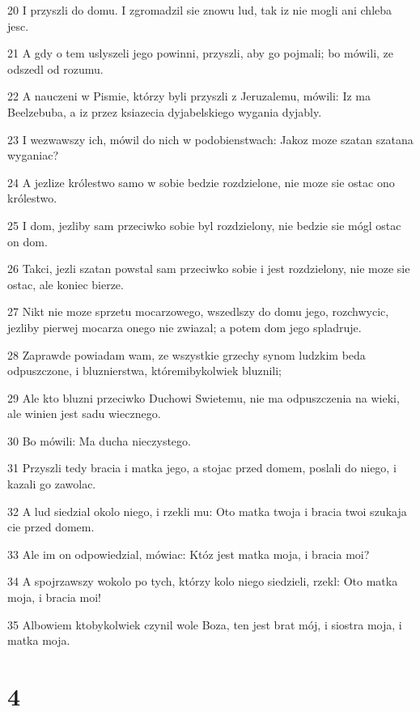 \par 20 I przyszli do domu. I zgromadzil sie znowu lud, tak iz nie mogli ani chleba jesc.
\par 21 A gdy o tem uslyszeli jego powinni, przyszli, aby go pojmali; bo mówili, ze odszedl od rozumu.
\par 22 A nauczeni w Pismie, którzy byli przyszli z Jeruzalemu, mówili: Iz ma Beelzebuba, a iz przez ksiazecia dyjabelskiego wygania dyjably.
\par 23 I wezwawszy ich, mówil do nich w podobienstwach: Jakoz moze szatan szatana wyganiac?
\par 24 A jezlize królestwo samo w sobie bedzie rozdzielone, nie moze sie ostac ono królestwo.
\par 25 I dom, jezliby sam przeciwko sobie byl rozdzielony, nie bedzie sie mógl ostac on dom.
\par 26 Takci, jezli szatan powstal sam przeciwko sobie i jest rozdzielony, nie moze sie ostac, ale koniec bierze.
\par 27 Nikt nie moze sprzetu mocarzowego, wszedlszy do domu jego, rozchwycic, jezliby pierwej mocarza onego nie zwiazal; a potem dom jego spladruje.
\par 28 Zaprawde powiadam wam, ze wszystkie grzechy synom ludzkim beda odpuszczone, i bluznierstwa, któremibykolwiek bluznili;
\par 29 Ale kto bluzni przeciwko Duchowi Swietemu, nie ma odpuszczenia na wieki, ale winien jest sadu wiecznego.
\par 30 Bo mówili: Ma ducha nieczystego.
\par 31 Przyszli tedy bracia i matka jego, a stojac przed domem, poslali do niego, i kazali go zawolac.
\par 32 A lud siedzial okolo niego, i rzekli mu: Oto matka twoja i bracia twoi szukaja cie przed domem.
\par 33 Ale im on odpowiedzial, mówiac: Któz jest matka moja, i bracia moi?
\par 34 A spojrzawszy wokolo po tych, którzy kolo niego siedzieli, rzekl: Oto matka moja, i bracia moi!
\par 35 Albowiem ktobykolwiek czynil wole Boza, ten jest brat mój, i siostra moja, i matka moja.

\chapter{4}


